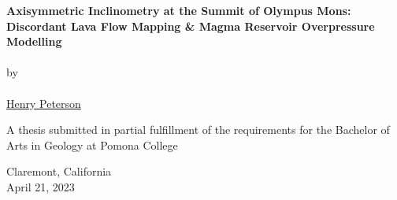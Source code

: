 \begin{titlepage}
    \begin{center}

        \phantom{.}

        \vfill
 
        \large\textbf{Axisymmetric Inclinometry at the Summit of Olympus Mons: Discordant Lava Flow Mapping \& Magma Reservoir Overpressure Modelling}
        \\~\\
        by
        \\~\\
        \href{mailto:hgpa2018@mymail.pomona.edu}{Henry Peterson}

        \vfill
        \vfill
        \vfill

        A thesis submitted in partial fulfillment of the requirements for the Bachelor of Arts in Geology at Pomona College

             
        \vfill
        \vfill
        \vfill

        Claremont, California\\
        April 21, 2023

    \end{center}
 \end{titlepage}